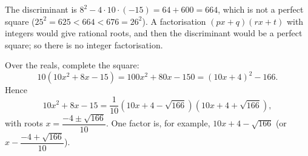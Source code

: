 The discriminant is $8^2-4\cdot10\cdot(-15)=64+600=664$, which is not a perfect square ($25^2=625<664<676=26^2$). A factorisation $(px+q)(rx+t)$ with integers would give rational roots, and then the discriminant would be a perfect square; so there is no integer factorisation.

Over the reals, complete the square:
\[
10\left(10x^2+8x-15\right)=100x^2+80x-150=(10x+4)^2-166 .
\]
Hence
\[
10x^2+8x-15=\boxed{\dfrac{1}{10}\left(10x+4-\sqrt{166}\right)\left(10x+4+\sqrt{166}\right)},
\]
with roots $x=\dfrac{-4\pm\sqrt{166}}{10}$. One factor is, for example, $10x+4-\sqrt{166}$ (or $x-\dfrac{-4+\sqrt{166}}{10}$).
